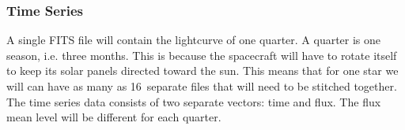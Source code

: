 \subsubsection{Time Series}
\label{ssub:Time Series}
A single FITS file will contain the lightcurve of one quarter.
A quarter is one season, i.e. three months.
This is because the spacecraft will have to rotate itself to keep its solar panels directed toward the sun.
This means that for one star we will can have as many as 16~separate files that will need to be stitched together.
The time series data consists of two separate vectors: time and flux.
The flux mean level will be different for each quarter.

